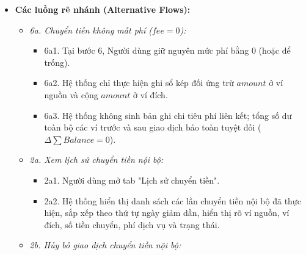 \documentclass[11pt,a4paper]{article}
\providecommand{\tightlist}{
  \setlength{\itemsep}{0pt}\setlength{\parskip}{0pt}}
\begin{document}
\begin{itemize}
\begin{enumerate}
    \begin{itemize}
    \tightlist
    \item
      Trừ số tiền \(amount\) khỏi số dư ví nguồn \(fromWalletId\).
    \item
      Cộng số tiền \(amount\) vào số dư ví đích \(toWalletId\).
    \item
      Lưu bản ghi chuyển tiền vào bảng \texttt{transfers} với mã định
      danh \texttt{transferId}.
    \end{itemize}
  \item
    Nếu \(fee > 0\), hệ thống tự động sinh một bản ghi chi tiêu
    (\texttt{Expense}) độc lập trong bảng \texttt{transactions} với số
    tiền \(fee\), trừ tiếp \(fee\) khỏi ví nguồn \(fromWalletId\), gắn
    với danh mục chi phí ngân hàng và lưu mã tham chiếu
    \texttt{linkedTransferId\ =\ transferId}.
  \item
    Hệ thống đồng bộ hóa dữ liệu cơ sở dữ liệu và xác nhận giao dịch
    hoàn tất thành công.
  \item
    Hệ thống hiển thị thông báo chuyển tiền thành công kèm thông tin chi
    tiết: số tiền chuyển, phí đã trừ, số dư mới của ví nguồn và ví đích.
  \end{enumerate}
\item
  \textbf{Các luồng rẽ nhánh (Alternative Flows):}

  \begin{itemize}
  \tightlist
  \item
    \emph{6a. Chuyển tiền không mất phí (\(fee = 0\)):}

    \begin{itemize}
    \tightlist
    \item
      6a1. Tại bước 6, Người dùng giữ nguyên mức phí bằng 0 (hoặc để
      trống).
    \item
      6a2. Hệ thống chỉ thực hiện ghi sổ kép đối ứng trừ \(amount\) ở ví
      nguồn và cộng \(amount\) ở ví đích.
    \item
      6a3. Hệ thống không sinh bản ghi chi tiêu phí liên kết; tổng số dư
      toàn bộ các ví trước và sau giao dịch bảo toàn tuyệt đối
      (\(\Delta \sum Balance = 0\)).
    \end{itemize}
  \item
    \emph{2a. Xem lịch sử chuyển tiền nội bộ:}

    \begin{itemize}
    \tightlist
    \item
      2a1. Người dùng mở tab "Lịch sử chuyển tiền".
    \item
      2a2. Hệ thống hiển thị danh sách các lần chuyển tiền nội bộ đã
      thực hiện, sắp xếp theo thứ tự ngày giảm dần, hiển thị rõ ví
      nguồn, ví đích, số tiền chuyển, phí dịch vụ và trạng thái.
    \end{itemize}
  \item
    \emph{2b. Hủy bỏ giao dịch chuyển tiền nội bộ:}


\end{itemize}
\end{itemize}
\end{document}
